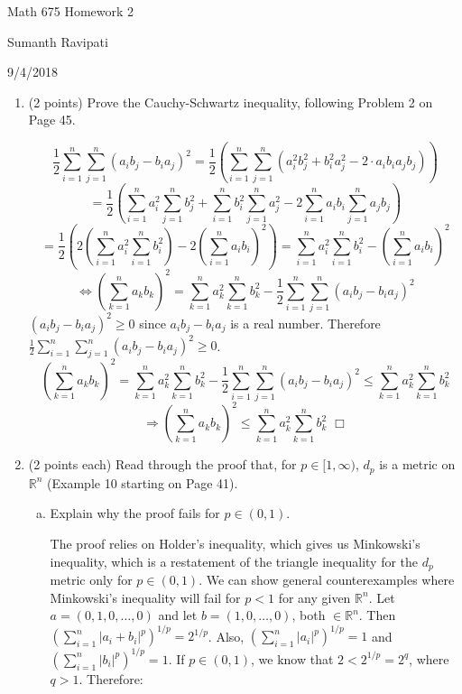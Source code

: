 \documentclass[12pt,letterpaper,reqno]{amsart}
\newcommand{\R}{\mathbb R}
\begin{document}
\thispagestyle{empty}
\centerline{\Large Math 675 Homework 2}
\centerline{Sumanth Ravipati}
\centerline{9/4/2018}
\vspace{.25in}

\begin{enumerate}[1.]
\item (2 points) Prove the Cauchy-Schwartz inequality, following Problem 2 on Page 45.
\begin{flushleft}
$$ \frac{1}{2}\sum\limits_{i=1}^n\sum\limits_{j=1}^n(a_i b_j - b_i a_j)^2 = \frac{1}{2}(\sum\limits_{i=1}^n\sum\limits_{j=1}^n(a_i^2 b_j^2 + b_i^2 a_j^2 - 2 \cdot a_i b_i a_j b_j)) $$
$$ = \frac{1}{2}(\sum\limits_{i=1}^n a_i^2 \sum\limits_{j=1}^n b_j^2 + \sum\limits_{i=1}^n b_i^2 \sum\limits_{j=1}^n a_j^2 - 2\sum\limits_{i=1}^n a_i b_i \sum\limits_{j=1}^n a_j b_j) $$
$$ = \frac{1}{2}(2(\sum\limits_{i=1}^n a_i^2 \sum\limits_{i=1}^n b_i^2) - 2(\sum\limits_{i=1}^n a_i b_i)^2) = \sum\limits_{i=1}^n a_i^2 \sum\limits_{i=1}^n b_i^2 - (\sum\limits_{i=1}^n a_i b_i)^2$$
$$ \Leftrightarrow (\sum\limits_{k=1}^n a_k b_k)^2 = \sum\limits_{k=1}^n a_k^2 \sum\limits_{k=1}^n b_k^2 - \frac{1}{2}\sum\limits_{i=1}^n\sum\limits_{j=1}^n(a_i b_j - b_i a_j)^2$$
$(a_i b_j - b_i a_j)^2 \geq 0$ since $a_i b_j - b_i a_j$ is a real number. Therefore $\frac{1}{2}\sum\limits_{i=1}^n\sum\limits_{j=1}^n(a_i b_j - b_i a_j)^2 \geq 0$.
$$ (\sum\limits_{k=1}^n a_k b_k)^2 = \sum\limits_{k=1}^n a_k^2 \sum\limits_{k=1}^n b_k^2 - \frac{1}{2}\sum\limits_{i=1}^n\sum\limits_{j=1}^n(a_i b_j - b_i a_j)^2 \leq \sum\limits_{k=1}^n a_k^2 \sum\limits_{k=1}^n b_k^2$$
$$ \Rightarrow (\sum\limits_{k=1}^n a_k b_k)^2 \leq \sum\limits_{k=1}^n a_k^2 \sum\limits_{k=1}^n b_k^2  \,\, \Box$$
\end{flushleft}
\item (2 points each) Read through the proof that, for $p\in [1,\infty)$, $d_p$ is a metric on $\R^n$ (Example 10 starting on Page 41). 
\begin{enumerate}[(a)]
\item Explain why the proof fails for $p\in (0,1)$.\newline
\begin{flushleft}
The proof relies on Holder's inequality, which gives us Minkowski's inequality, which is a restatement of the triangle inequality for the $d_p$ metric only for $p\in (0,1)$. We can show general counterexamples where Minkowski's inequality will fail for $p < 1$ for any given $\R^n$.\newline
Let $a = (0,1,0,\ldots,0)$ and let $b = (1,0,\ldots,0)$, both $\in \R^n$. Then $\left(\sum\limits_{i=1}^n |a_i + b_i|^p\right)^{1/p} = 2^{1/p}$. Also, $\left(\sum\limits_{i=1}^n |a_i|^p\right)^{1/p} = 1$ and $\left(\sum\limits_{i=1}^n |b_i|^p\right)^{1/p} = 1$. \newline If $p\in (0,1)$, we know that $2 < 2^{1/p} = 2^q$, where $q > 1$. Therefore:

\end{flushleft}
\end{enumerate}
\end{enumerate}
\end{document}
